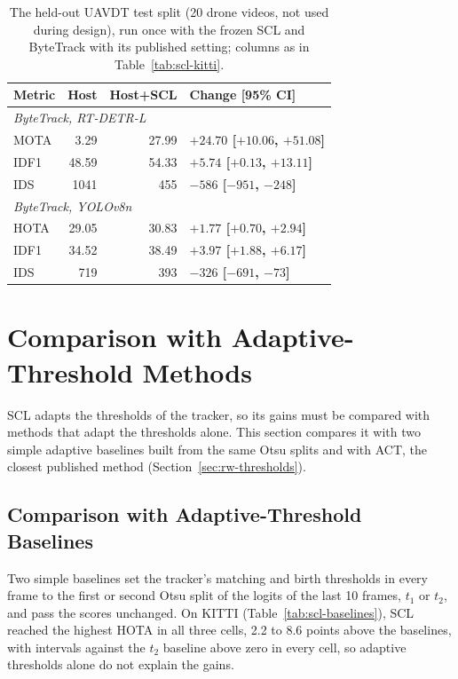 \begin{table}[tbp]
\centering
\caption{The held-out UAVDT test split (20 drone videos, not used during design), run once with the frozen SCL and ByteTrack with its published setting; columns as in Table~\ref{tab:scl-kitti}.}
\label{tab:scl-uavdt}
\begin{tabular}{lrrl}
\toprule
Metric & Host & Host+SCL & Change [95\% CI]\\
\midrule
\multicolumn{4}{l}{\textit{ByteTrack, RT-DETR-L} \cite{zhang2022bytetrack,zhao2024rtdetr}}\\
\quad MOTA & 3.29 & 27.99 & \textbf{$+24.70$ [$+10.06$, $+51.08$]}\\
\quad IDF1 & 48.59 & 54.33 & \textbf{$+5.74$ [$+0.13$, $+13.11$]}\\
\quad IDS & 1041 & 455 & \textbf{$-586$ [$-951$, $-248$]}\\
\multicolumn{4}{l}{\textit{ByteTrack, YOLOv8n} \cite{zhang2022bytetrack,jocher2023yolov8}}\\
\quad HOTA & 29.05 & 30.83 & \textbf{$+1.77$ [$+0.70$, $+2.94$]}\\
\quad IDF1 & 34.52 & 38.49 & \textbf{$+3.97$ [$+1.88$, $+6.17$]}\\
\quad IDS & 719 & 393 & \textbf{$-326$ [$-691$, $-73$]}\\
\bottomrule
\end{tabular}
\end{table}

\section{Comparison with Adaptive-Threshold Methods}\label{sec:scl-compare}
SCL adapts the thresholds of the tracker, so its gains must be compared with methods that adapt the thresholds alone. This section compares it with two simple adaptive baselines built from the same Otsu splits and with ACT, the closest published method (Section~\ref{sec:rw-thresholds}).

\subsection{Comparison with Adaptive-Threshold Baselines}\label{sec:scl-baselines}
Two simple baselines set the tracker's matching and birth thresholds in every frame to the first or second Otsu split of the logits of the last 10 frames, $t_1$ or $t_2$, and pass the scores unchanged. On KITTI (Table~\ref{tab:scl-baselines}), SCL reached the highest HOTA in all three cells, 2.2 to 8.6 points above the baselines, with intervals against the $t_2$ baseline above zero in every cell, so adaptive thresholds alone do not explain the gains.

